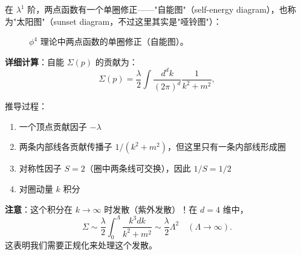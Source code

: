 \begin{example}
在 $\lambda^1$ 阶，两点函数有一个单圈修正——"自能图"（self-energy diagram），也称为"太阳图"（sunset diagram，不过这里其实是"哑铃图"）：
\begin{figure}[htbp]
\centering
{}
\caption{$\phi^4$ 理论中两点函数的单圈修正（自能图）。}
\label{fig:phi4_self_energy}
\end{figure}

\textbf{详细计算}：自能 $\Sigma(p)$ 的贡献为：
\begin{equation}
    \Sigma(p) = \frac{\lambda}{2} \int \frac{d^d k}{(2\pi)^d} \frac{1}{k^2 + m^2},
\end{equation}

推导过程：
\begin{enumerate}
    \item 一个顶点贡献因子 $-\lambda$
    \item 两条内部线各贡献传播子 $1/(k^2 + m^2)$，但这里只有一条内部线形成圈
    \item 对称性因子 $S = 2$（圈中两条线可交换），因此 $1/S = 1/2$
    \item 对圈动量 $k$ 积分
\end{enumerate}

\textbf{注意}：这个积分在 $k \to \infty$ 时发散（紫外发散）！在 $d = 4$ 维中，
\begin{equation}
    \Sigma \sim \frac{\lambda}{2} \int_0^\Lambda \frac{k^3 dk}{k^2 + m^2} \sim \frac{\lambda}{2} \Lambda^2 \quad (\Lambda \to \infty).
\end{equation}
这表明我们需要正规化来处理这个发散。
\end{example}

